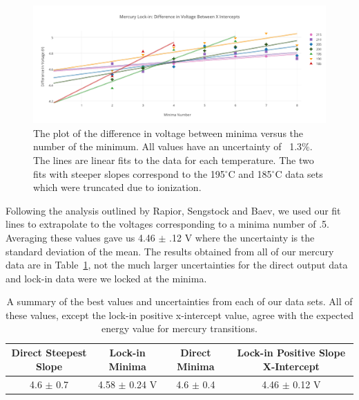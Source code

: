 \documentclass[prb,preprint]{revtex4-1}
\begin{document}
\begin{figure}[h!]
\centering

\includegraphics[width=6in]{lockin_intercepts.pdf}
\caption{The plot of the difference in voltage between minima versus the number of the minimum. All values have an uncertainty of ~1.3$\%$. The lines are linear fits to the data for each temperature. The two fits with steeper slopes correspond to the 195$^{\circ}$C and 185$^{\circ}$C data sets which were truncated due to ionization.}

\label{lockin_intercepts}
\end{figure}

Following the analysis outlined by Rapior, Sengstock and Baev, we used our fit lines to extrapolate to the voltages corresponding to a minima number of .5. Averaging these values gave us 4.46 $\pm$ .12 V where the uncertainty is the standard deviation of the mean. The results obtained from all of our mercury data are in Table~\ref{hg_results}, not the much larger uncertainties for the direct output data and lock-in data were we locked at the minima.  


\begin{table}[h!]
\centering
\caption{A summary of the best values and uncertainties from each of our data sets. All of these values, except the lock-in positive x-intercept value, agree with the expected energy value for mercury transitions.}
\begin{ruledtabular}
\begin{tabular}{c c c c}
 Direct Steepest Slope & Lock-in Minima & Direct Minima & Lock-in Positive Slope X-Intercept   \\
\hline	%

 4.6 $\pm$ 0.7 & 4.58 $\pm$ 0.24 V & 4.6 $\pm$ 0.4 & 4.46 $\pm$ 0.12 V  \\

\end{tabular}
\end{ruledtabular}
\label{hg_results}
\end{table}
\end{document}
